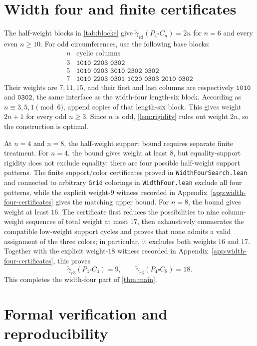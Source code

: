 \documentclass[11pt]{article}
\theoremstyle{definition}
\theoremstyle{remark}
\newcommand{\srdom}{\widetilde\gamma_{r3}}
\begin{document}
\section{Width four and finite certificates}\label{sec:width-four}

The half-weight blocks in \cref{tab:blocks} give $\srdom(P_4\square C_n)=2n$ for $n=6$ and every even $n\geq 10$. For odd circumferences, use the following base blocks:
\[
\begin{array}{c|l}
 n&\text{cyclic columns}\\
\hline
3&\texttt{1010 2203 0302}\\
5&\texttt{1010 0203 3010 2302 0302}\\
7&\texttt{1010 2203 0301 1020 0303 2010 0302}
\end{array}
\]
Their weights are $7,11,15$, and their first and last columns are respectively $\texttt{1010}$ and $\texttt{0302}$, the same interface as the width-four length-six block. According as $n\equiv 3,5,1\pmod 6$, append copies of that length-six block. This gives weight $2n+1$ for every odd $n\geq 3$. Since $n$ is odd, \cref{lem:rigidity} rules out weight $2n$, so the construction is optimal.

At $n=4$ and $n=8$, the half-weight support bound requires separate finite treatment. For $n=4$, the bound gives weight at least $8$, but equality-support rigidity does not exclude equality: there are four possible half-weight support patterns. The finite support/color certificates proved in \texttt{WidthFourSearch.lean} and connected to arbitrary \texttt{Grid} colorings in \texttt{WidthFour.lean} exclude all four patterns, while the explicit weight-$9$ witness recorded in Appendix~\ref{app:width-four-certificates} gives the matching upper bound. For $n=8$, the bound gives weight at least $16$. The certificate first reduces the possibilities to nine column-weight sequences of total weight at most $17$, then exhaustively enumerates the compatible low-weight support cycles and proves that none admits a valid assignment of the three colors; in particular, it excludes both weights $16$ and $17$. Together with the explicit weight-$18$ witness recorded in Appendix~\ref{app:width-four-certificates}, this proves
\[
 \srdom(P_4\square C_4)=9,\qquad
 \srdom(P_4\square C_8)=18.
\]
This completes the width-four part of \cref{thm:main}.

\section{Formal verification and reproducibility}\label{sec:formal}
\end{document}
